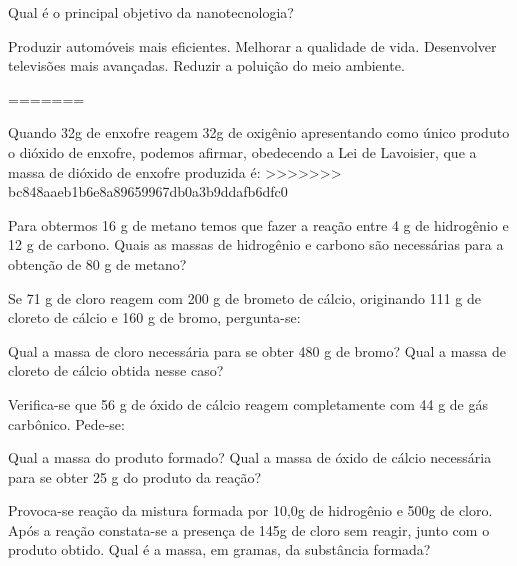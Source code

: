 \documentclass[10pt]{scrartcl}
\begin{document}
\begin{exercise}[points=1]
Qual é o principal objetivo da nanotecnologia?
\begin{choice}
\choice Produzir automóveis mais eficientes.
\choice Melhorar a qualidade de vida.
\choice Desenvolver televisões mais avançadas.
\choice Reduzir a poluição do meio ambiente.
\end{choice}
=======
\begin{exercise}
Quando 32g de enxofre reagem 32g de oxigênio apresentando como único
produto o dióxido de enxofre, podemos afirmar, obedecendo a Lei de Lavoisier,
que a massa de dióxido de enxofre produzida é:
>>>>>>> bc848aaeb1b6e8a89659967db0a3b9ddafb6dfc0
\end{exercise}




\begin{exercise}
Para obtermos 16 g de metano temos que fazer a reação entre 4 g de
hidrogênio e 12 g de carbono. Quais as massas de hidrogênio e carbono são
necessárias para a obtenção de 80 g de metano?
\end{exercise}




\begin{exercise}
Se 71 g de cloro reagem com 200 g de brometo de cálcio, originando 111 g
de cloreto de cálcio e 160 g de bromo, pergunta-se:

\begin{choice}
\choice Qual a massa de cloro necessária para se obter 480 g de bromo?
\choice  Qual a massa de cloreto de cálcio obtida nesse caso?
\end{choice}
\end{exercise}



\begin{exercise}
Verifica-se que 56 g de óxido de cálcio reagem completamente com 44 g de
gás carbônico. Pede-se:

\begin{choice}
\choice Qual a massa do produto formado?
\choice Qual a massa de óxido de cálcio necessária para se obter 25 g do
produto da reação?
\end{choice}
\end{exercise}





\begin{exercise}
Provoca-se reação da mistura formada por 10,0g de hidrogênio e 500g de cloro. Após a reação constata-se a presença de 145g de cloro sem reagir, junto com o produto obtido. Qual é a massa, em gramas, da substância formada?
\end{exercise}




\end{exercise}
\end{document}
